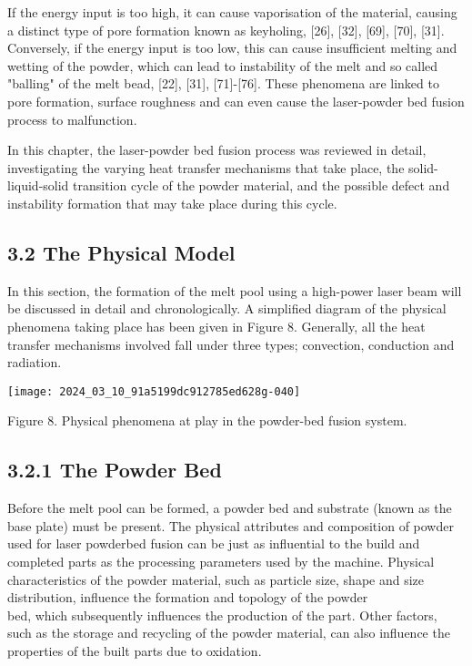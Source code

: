 \documentclass[10pt]{article}
\begin{document}
If the energy input is too high, it can cause vaporisation of the material, causing a distinct type of pore formation known as keyholing, [26], [32], [69], [70], [31]. Conversely, if the energy input is too low, this can cause insufficient melting and wetting of the powder, which can lead to instability of the melt and so called "balling" of the melt bead, [22], [31], [71]-[76]. These phenomena are linked to pore formation, surface roughness and can even cause the laser-powder bed fusion process to malfunction.

In this chapter, the laser-powder bed fusion process was reviewed in detail, investigating the varying heat transfer mechanisms that take place, the solid-liquid-solid transition cycle of the powder material, and the possible defect and instability formation that may take place during this cycle.

\subsection*{3.2 The Physical Model}
In this section, the formation of the melt pool using a high-power laser beam will be discussed in detail and chronologically. A simplified diagram of the physical phenomena taking place has been given in Figure 8. Generally, all the heat transfer mechanisms involved fall under three types; convection, conduction and radiation.

\begin{center}
\texttt{[image: 2024\_03\_10\_91a5199dc912785ed628g-040]}
\end{center}

Figure 8. Physical phenomena at play in the powder-bed fusion system.

\subsection*{3.2.1 The Powder Bed}
Before the melt pool can be formed, a powder bed and substrate (known as the base plate) must be present. The physical attributes and composition of powder used for laser powderbed fusion can be just as influential to the build and completed parts as the processing parameters used by the machine. Physical characteristics of the powder material, such as particle size, shape and size distribution, influence the formation and topology of the powder\\
bed, which subsequently influences the production of the part. Other factors, such as the storage and recycling of the powder material, can also influence the properties of the built parts due to oxidation.
\end{document}
